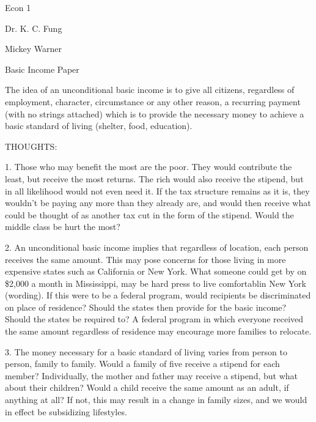\documentclass[12pt]{article}
\begin{document}
\noindent Econ 1

\noindent Dr. K. C. Fung
\bigskip

\noindent Mickey Warner

\begin{center}
Basic Income Paper
\end{center}

The idea of an unconditional basic income is to give all citizens, regardless of employment, character, circumstance or any other reason, a recurring payment (with no strings attached) which is to provide the necessary money to achieve a basic standard of living (shelter, food, education).


THOUGHTS:

1. Those who may benefit the most are the poor. They would contribute the least, but receive the most returns. The rich would also receive the stipend, but in all likelihood would not even need it. If the tax structure remains as it is, they wouldn't be paying any more than they already are, and would then receive what could be thought of as another tax cut in the form of the stipend. Would the middle class be hurt the most?

2. An unconditional basic income implies that regardless of location, each person receives the same amount. This may pose concerns for those living in more expensive states such as California or New York. What someone could get by on \$2,000 a month in Mississippi, may be hard press to live comfortablin New York (wording). If this were to be a federal program, would recipients be discriminated on place of residence? Should the states then provide for the basic income? Should the states be required to? A federal program in which everyone received the same amount regardless of residence may encourage more families to relocate.

3. The money necessary for a basic standard of living varies from person to person, family to family. Would a family of five receive a stipend for each member? Individually, the mother and father may receive a stipend, but what about their children? Would a child receive the same amount as an adult, if anything at all? If not, this may result in a change in family sizes, and we would in effect be subsidizing lifestyles.
\end{document}
